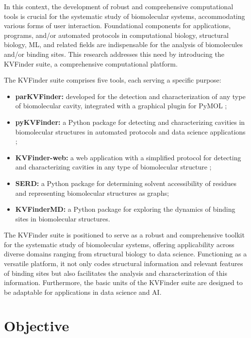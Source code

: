 \documentclass[Ingles]{phdthesis}
\begin{document}
In this context, the development of robust and comprehensive computational tools is crucial for the systematic study of biomolecular systems, accommodating various forms of user interaction. Foundational components for applications, programs, and/or automated protocols in computational biology, structural biology, \ac{ML}, and related fields are indispensable for the analysis of biomolecules and/or binding sites. This research addresses this need by introducing the KVFinder suite, a comprehensive computational platform.

The KVFinder suite comprises five tools, each serving a specific purpose:

\begin{itemize}
  \item \textbf{parKVFinder:} developed for the detection and characterization of any type of biomolecular cavity, integrated with a graphical plugin for PyMOL \cite{guerra2019,guerra2020};
  \item \textbf{pyKVFinder:} a Python package for detecting and characterizing cavities in biomolecular structures in automated protocols and data science applications \cite{guerra2021};
  \item \textbf{KVFinder-web:} a web application with a simplified protocol for detecting and characterizing cavities in any type of biomolecular structure \cite{guerra2023A};
  \item \textbf{SERD:} a Python package for determining solvent accessibility of residues and representing biomolecular structures as graphs;
  \item \textbf{KVFinderMD:} a Python package for exploring the dynamics of binding sites in biomolecular structures.
\end{itemize}

The KVFinder suite is positioned to serve as a robust and comprehensive toolkit for the systematic study of biomolecular systems, offering applicability across diverse domains ranging from structural biology to data science. Functioning as a versatile platform, it not only codes structural information and relevant features of binding sites but also facilitates the analysis and characterization of this information. Furthermore, the basic units of the KVFinder suite are designed to be adaptable for applications in data science and \acs{AI}.


\chapter{Objective}
\end{document}
